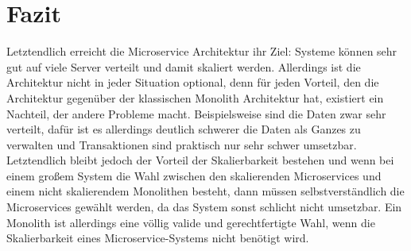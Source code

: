 \chapter{Fazit}

Letztendlich erreicht die Microservice Architektur ihr Ziel: Systeme können sehr gut auf viele Server verteilt und damit skaliert werden. Allerdings ist die Architektur nicht in jeder Situation optional, denn für jeden Vorteil, den die Architektur gegenüber der klassischen Monolith Architektur hat, existiert ein Nachteil, der andere Probleme macht. Beispielsweise sind die Daten zwar sehr verteilt, dafür ist es allerdings deutlich schwerer die Daten als Ganzes zu verwalten und Transaktionen sind praktisch nur sehr schwer umsetzbar. Letztendlich bleibt jedoch der Vorteil der Skalierbarkeit bestehen und wenn bei einem großem System die Wahl zwischen den skalierenden Microservices und einem nicht skalierendem Monolithen besteht, dann müssen selbstverständlich die Microservices gewählt werden, da das System sonst schlicht nicht umsetzbar. Ein Monolith ist allerdings eine völlig valide und gerechtfertigte Wahl, wenn die Skalierbarkeit eines Microservice-Systems nicht benötigt wird.

